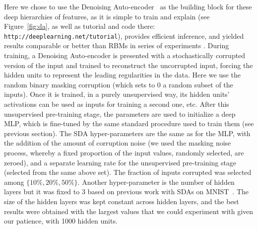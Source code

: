 \documentclass{article} %
\begin{document}
Here we chose to use the Denoising
Auto-encoder~\citep{VincentPLarochelleH2008} as the building block for
these deep hierarchies of features, as it is simple to train and
explain (see Figure~\ref{fig:da}, as well as 
tutorial and code there: {\tt http://deeplearning.net/tutorial}), 
provides efficient inference, and yielded results
comparable or better than RBMs in series of experiments
\citep{VincentPLarochelleH2008}. During training, a Denoising
Auto-encoder is presented with a stochastically corrupted version
of the input and trained to reconstruct the uncorrupted input,
forcing the hidden units to represent the leading regularities in
the data. Here we use the random binary masking corruption
(which sets to 0 a random subset of the inputs).
 Once it is trained, in a purely unsupervised way, 
its hidden units' activations can
be used as inputs for training a second one, etc.
After this unsupervised pre-training stage, the parameters
are used to initialize a deep MLP, which is fine-tuned by
the same standard procedure used to train them (see previous section).
The SDA hyper-parameters are the same as for the MLP, with the addition of the
amount of corruption noise (we used the masking noise process, whereby a
fixed proportion of the input values, randomly selected, are zeroed), and a
separate learning rate for the unsupervised pre-training stage (selected
from the same above set). The fraction of inputs corrupted was selected
among $\{10\%, 20\%, 50\%\}$. Another hyper-parameter is the number
of hidden layers but it was fixed to 3 based on previous work with
SDAs on MNIST~\citep{VincentPLarochelleH2008}. The size of the hidden
layers was kept constant across hidden layers, and the best results
were obtained with the largest values that we could experiment
with given our patience, with 1000 hidden units.

\end{document}
